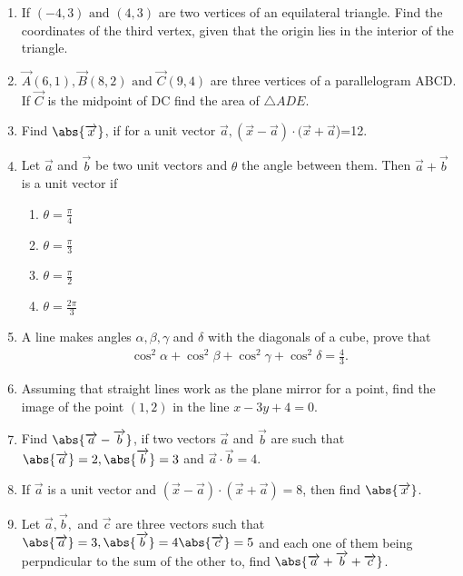 \begin{enumerate}[label=\thesubsection.\arabic*,ref=\thesubsection.\theenumi]
\item If $(-4,3)\text{ and }(4,3)$ are two vertices of an equilateral triangle. Find the coordinates of the third vertex, given that the origin lies in the interior of the triangle. 
\item $\vec{A} (6,1),\vec{B}(8,2) \text{ and } \vec{C}(9,4)$ are three vertices of a parallelogram ABCD. If $\vec{C}$ is the midpoint of DC find the area of $\triangle ADE$.
\item Find $\abs{\overrightarrow {x}}$, if for a unit vector $\overrightarrow {a}, (\overrightarrow {x}-\overrightarrow {a})\cdot (\overrightarrow {x}+\overrightarrow {a}$)=12.
	\\
\solution 
		
\item Let $\vec{a}$ and $\vec{b}$ be two unit vectors and $\theta$ the angle between them. Then $\vec{a}+\vec{b}$ is a unit vector if
	\begin{enumerate}
			\itemsep2pt
		\item $\theta = \frac{\pi}{4}$
		\item $\theta = \frac{\pi}{3}$
		\item $\theta = \frac{\pi}{2}$
		\item $\theta = \frac{2\pi}{3}$
			\end{enumerate}
\solution

\item A line makes angles $\alpha, \beta, \gamma$ and $\delta$  with the diagonals of a cube, prove that 
\begin{align}
\cos^2\alpha +\cos^2\beta +\cos^2\gamma +\cos^2\delta = \frac{4}{3}.
\end{align}
\item Assuming that straight lines work as the plane mirror for a point, find the image of the point $(1,2)$ in the line $x-3y+4=0$.
\item Find $\abs{\overrightarrow{a}-\overrightarrow{b}}$, if two vectors $\overrightarrow{a}$ and $\overrightarrow{b}$ are such that $\abs{\overrightarrow{a}}=2, \abs{\overrightarrow{b}}=3$ and $\overrightarrow{a} \cdot \overrightarrow{b}=4$.
\item If $\overrightarrow{a}$ is a unit vector and $(\overrightarrow{x}-\overrightarrow{a}) \cdot (\overrightarrow{x}+\overrightarrow{a})=8$, then find $\abs{\overrightarrow{x}}$.
\item Let $\overrightarrow{a}, \overrightarrow{b},$ and $ \overrightarrow{c}$ are three vectors such that $\abs{\overrightarrow{a}}=3, \abs{\overrightarrow{b}}=4 \abs{\overrightarrow{c}}=5$ and each one of them being perpndicular to the sum of the other to, find $\abs{\overrightarrow{a}+\overrightarrow{b}+\overrightarrow{c}}$.

\end{enumerate}
